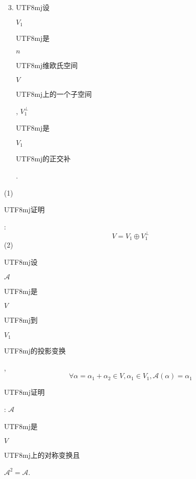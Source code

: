 \documentclass[10pt]{article}
\begin{document}
\begin{enumerate}
  \setcounter{enumi}{2}
  \item \begin{CJK}{UTF8}{mj}设\end{CJK} $V_{1}$ \begin{CJK}{UTF8}{mj}是\end{CJK} $n$ \begin{CJK}{UTF8}{mj}维欧氏空间\end{CJK} $V$ \begin{CJK}{UTF8}{mj}上的一个子空间\end{CJK}, $V_{1}^{\perp}$ \begin{CJK}{UTF8}{mj}是\end{CJK} $V_{1}$ \begin{CJK}{UTF8}{mj}的正交补\end{CJK}.
\end{enumerate}
(1) \begin{CJK}{UTF8}{mj}证明\end{CJK}:
$$
V=V_{1} \oplus V_{1}^{\perp}
$$
(2) \begin{CJK}{UTF8}{mj}设\end{CJK} $\mathscr{A}$ \begin{CJK}{UTF8}{mj}是\end{CJK} $V$ \begin{CJK}{UTF8}{mj}到\end{CJK} $V_{1}$ \begin{CJK}{UTF8}{mj}的投影变换\end{CJK},
$$
\forall \alpha=\alpha_{1}+\alpha_{2} \in V, \alpha_{1} \in V_{1}, \mathscr{A}(\alpha)=\alpha_{1}
$$
\begin{CJK}{UTF8}{mj}证明\end{CJK}: $\mathscr{A}$ \begin{CJK}{UTF8}{mj}是\end{CJK} $V$ \begin{CJK}{UTF8}{mj}上的对称变换且\end{CJK} $\mathscr{A}^{2}=\mathscr{A}$.
\end{document}
